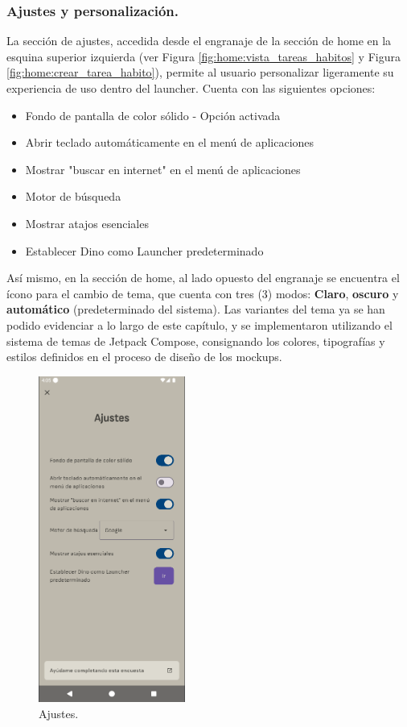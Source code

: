 \subsubsection{Ajustes y personalización.}

La sección de ajustes, accedida desde el engranaje de la sección de home en la esquina superior izquierda (ver Figura \ref{fig:home:vista_tareas_habitos} y Figura \ref{fig:home:crear_tarea_habito}), permite al usuario personalizar ligeramente su experiencia de uso dentro del launcher. Cuenta con las siguientes opciones:

\begin{itemize}
\item Fondo de pantalla de color sólido - Opción activada
\item Abrir teclado automáticamente en el menú de aplicaciones
\item Mostrar "buscar en internet" en el menú de aplicaciones
\item Motor de búsqueda
\item Mostrar atajos esenciales
\item Establecer Dino como Launcher predeterminado
\end{itemize}

Así mismo, en la sección de home, al lado opuesto del engranaje se encuentra el ícono para el cambio de tema, que cuenta con tres (3) modos: \textbf{Claro}, \textbf{oscuro} y \textbf{automático} (predeterminado del sistema). Las variantes del tema ya se han podido evidenciar a lo largo de este capítulo, y se implementaron utilizando el sistema de temas de Jetpack Compose, consignando los colores, tipografías y estilos definidos en el proceso de diseño de los mockups.

\begin{figure}[ht!]
  \centering
  \captionsetup{justification=centering}
    \caption{Ajustes.}
    \label{fig:ajustes}
    \includegraphics[width=0.43\textwidth]{Figuras/secciones/ajustes.png}
    \centering
\end{figure}


